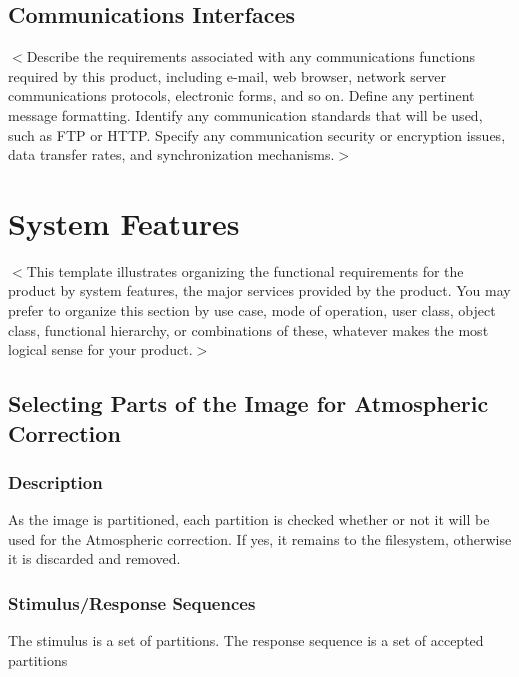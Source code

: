 \documentclass{scrreprt}
\begin{document}
\section{Communications Interfaces}
$<$Describe the requirements associated with any communications functions 
required by this product, including e-mail, web browser, network server 
communications protocols, electronic forms, and so on. Define any pertinent 
message formatting. Identify any communication standards that will be used, such 
as FTP or HTTP. Specify any communication security or encryption issues, data 
transfer rates, and synchronization mechanisms.$>$


\chapter{System Features}
$<$This template illustrates organizing the functional requirements for the 
product by system features, the major services provided by the product. You may 
prefer to organize this section by use case, mode of operation, user class, 
object class, functional hierarchy, or combinations of these, whatever makes the 
most logical sense for your product.$>$

\section{Selecting Parts of the Image for Atmospheric Correction}

\subsection{Description}
As the image is partitioned, each partition is checked whether or not it will be used for the
Atmospheric correction. If yes, it remains to the filesystem, otherwise it is discarded and removed.

\subsection{Stimulus/Response Sequences}
The stimulus is a set of partitions. The response sequence is a set of accepted partitions
\end{document}
